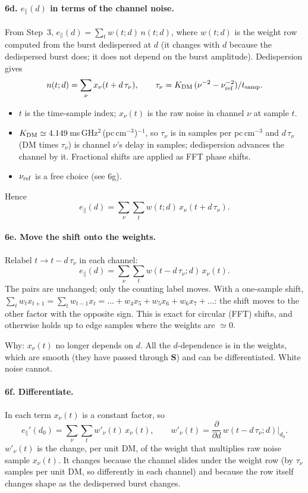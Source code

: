 \documentclass[11pt]{article}
\newcommand{\vb}[1]{\boldsymbol{#1}}
\newcommand{\Sm}{\vb S}
\newcommand{\ep}{e_\parallel}
\newcommand{\tch}{\tau_{\nu}}
\newcommand{\xch}{x_{\nu}}
\begin{document}
\paragraph{6d. $\ep(d)$ in terms of the channel noise.}
From Step~3, $\ep(d)=\sum_tw(t;d)\,n(t;d)$, where $w(t;d)$ is the weight row computed from the burst
dedispersed at $d$ (it changes with $d$ because the dedispersed burst does; it does not depend on the burst
amplitude). Dedispersion gives
\begin{equation}
n(t;d)=\sum_{\nu}\xch(t+d\,\tch),\qquad \tch=K_{\rm DM}\,(\nu^{-2}-\nu_{\rm ref}^{-2})/t_{\rm samp}.
\end{equation}
\begin{itemize}
\item $t$ is the time-sample index; $\xch(t)$ is the raw noise in channel $\nu$ at sample $t$.
\item $K_{\rm DM}\simeq4.149$\,ms\,GHz$^{2}$\,(pc\,cm$^{-3}$)$^{-1}$, so $\tch$ is in samples per pc\,cm$^{-3}$
and $d\,\tch$ (DM times $\tch$) is channel $\nu$'s delay in samples; dedispersion advances the channel by it.
Fractional shifts are applied as FFT phase shifts.
\item $\nu_{\rm ref}$ is a free choice (see 6g).
\end{itemize}
Hence
\begin{equation}
\ep(d)=\sum_{\nu}\sum_tw(t;d)\,\xch(t+d\,\tch).
\end{equation}

\paragraph{6e. Move the shift onto the weights.}
Relabel $t\to t-d\,\tch$ in each channel:
\begin{equation}
\ep(d)=\sum_{\nu}\sum_tw(t-d\,\tch;d)\,\xch(t).
\label{eq:relab}
\end{equation}
The pairs are unchanged; only the counting label moves. With a one-sample shift,
$\sum_tw_tx_{t+1}=\sum_tw_{t-1}x_t=\ldots+w_4x_5+w_5x_6+w_6x_7+\ldots$: the shift moves to the other factor with
the opposite sign. This is exact for circular (FFT) shifts, and otherwise holds up to edge samples where the
weights are $\simeq0$.

Why: $\xch(t)$ no longer depends on $d$. All the $d$-dependence is in the weights, which are smooth (they
have passed through $\Sm$) and can be differentiated. White noise cannot.

\paragraph{6f. Differentiate.}
In each term $\xch(t)$ is a constant factor, so
\begin{equation}
\ep'(d_0)=\sum_{\nu}\sum_tw'_{\nu}(t)\,\xch(t),\qquad
w'_{\nu}(t)=\frac{\partial}{\partial d}\,w(t-d\,\tch;d)\Big|_{d_0}.
\end{equation}
$w'_{\nu}(t)$ is the change, per unit DM, of the weight that multiplies raw noise sample $\xch(t)$. It
changes because the channel slides under the weight row (by $\tch$ samples per unit DM, so differently in
each channel) and because the row itself changes shape as the dedispersed burst changes.
\end{document}
